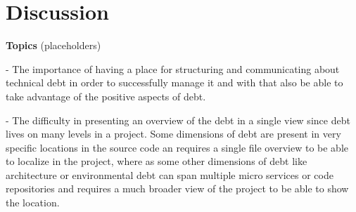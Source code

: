 

\section{Discussion}

\textbf{Topics} (placeholders)

- The importance of having a place for structuring and communicating about technical debt in order to successfully manage it and with that also be able to take advantage of the positive aspects of debt.

- The difficulty in presenting an overview of the debt in a single view since debt lives on many levels in a project. Some dimensions of debt are present in very specific locations in the source code an requires a single file overview to be able to localize in the project, where as some other dimensions of debt like architecture or environmental debt can span multiple micro services or code repositories and requires a much broader view of the project to be able to show the location.